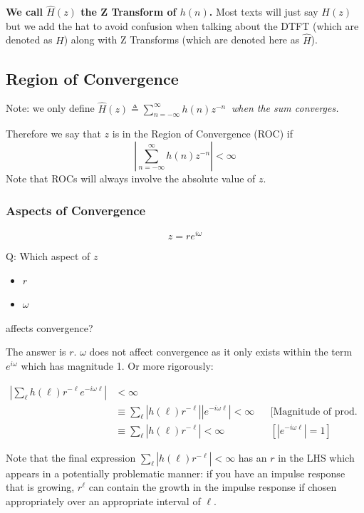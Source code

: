 \textbf{We call $\hat H(z)$ the Z Transform of $h(n)$.} Most texts will just say $H(z)$ but we add the hat to avoid confusion when talking about the DTFT (which are denoted as $H$) along with Z Transforms (which are denoted here as $\hat H$).

\subsection{Region of Convergence}
Note: we only define $\displaystyle\hat H(z)\triangleq\sum_{n=-\infty}^\infty h(n)z^{-n}\ $ \textit{when the sum converges.}

Therefore we say that $z$ is in the Region of Convergence (ROC) if
\[
    \left|\sum_{n=-\infty}^\infty h(n)z^{-n}\right| < \infty
\]
Note that ROCs will always involve the absolute value of $z$.

\subsubsection{Aspects of Convergence}
\[
    z=re^{i\omega}
\]
\begin{shaded}
Q: Which aspect of $z$
\begin{itemize}
    \item $r$
    \item $\omega$
\end{itemize}
affects convergence?
\end{shaded}

The answer is $r$. $\omega$ does not affect convergence as it only exists within the term $e^{i\omega}$ which has magnitude 1. Or more rigorously:

\begin{align*}
    \left|\sum_\ell h(\ell)r^{-\ell}e^{-i\omega\ell}\right|&<\infty
    \\
    &\equiv
    \sum_\ell \left|h(\ell)r^{-\ell}\right|\left|e^{-i\omega\ell}\right|
    <\infty
    &&\text{[Magnitude of prod. = prod. of the magnitudes]}
    \\
    &\equiv
    \sum_\ell \left|h(\ell)r^{-\ell}\right|
    <\infty
    &&\text{$\left[|e^{-i\omega\ell}|=1\right]$}
\end{align*}

Note that the final expression $\sum_\ell \left|h(\ell)r^{-\ell}\right|<\infty$ has an $r$ in the LHS which appears in a potentially problematic manner:
if you have an impulse response that is growing, $r^\ell$ can contain the growth in the impulse response if chosen appropriately over an appropriate interval of $\ell$.

